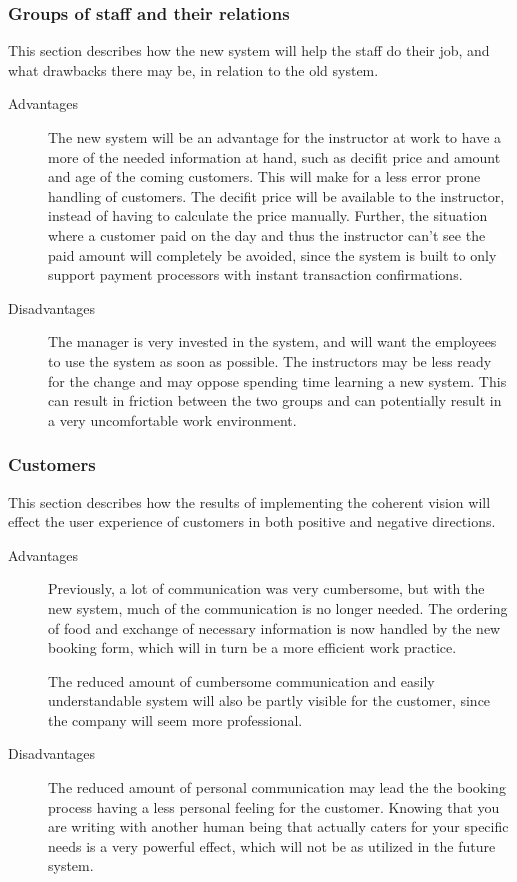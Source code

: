 \subsubsection{Groups of staff and their relations}
This section describes how the new system will help the staff do their 
job, and what drawbacks there may be, in relation to the old system.

\begin{description}
\item[Advantages]
The new system will be an
advantage for the instructor at work to have a more of the needed information
at hand, such as decifit price and amount and age of the coming customers. 
This will make for a less error prone handling of customers. The 
decifit price will be available to the instructor, instead of having to 
calculate the price manually. Further, the situation where a customer paid on 
the day and thus the instructor can't see the paid amount will completely be 
avoided, since the system is built to only support payment processors with 
instant transaction confirmations.

\item[Disadvantages]
The manager is very invested in the system, and will want the employees to 
use the system as soon as possible. The instructors may be less ready for the change and may
oppose spending time learning a new system. This can result in friction between
the two groups and can potentially result in a very uncomfortable work 
environment. 
\end{description}

\subsubsection{Customers}
This section describes how the results of implementing the coherent vision will 
effect the user experience of customers in both positive and negative 
directions.

\begin{description}
\item[Advantages]
Previously, a lot of communication was very cumbersome, but 
with the new system, much of the communication is no longer needed. The 
ordering of food and exchange of necessary information is now handled by the 
new booking form, which will in turn be a more efficient work practice.

The reduced amount of cumbersome communication and easily understandable system
will also be partly visible for the customer, since the company will seem more
professional.

\item[Disadvantages]
The reduced amount of personal communication may lead the the booking process having
a less personal feeling for the customer. Knowing that you are writing with
another human being that actually caters for your specific needs is a very 
powerful effect, which will not be as utilized in the future system. 
\end{description}

